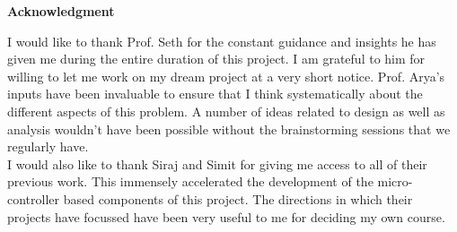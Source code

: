\newpage
\vspace*{0.75in}
\label{pg:ack}
\begin{center} {\bf \Huge Acknowledgment}\\[0.5in] \end{center}
{\normalsize I would like to thank Prof. Seth for the constant guidance and insights he has given me during
the entire duration of this project. I am grateful to him for willing to let me work on my dream project at a very short notice. Prof. Arya's inputs have been invaluable to ensure
that I think systematically about the different aspects of this problem. A number of ideas related to design as well as analysis wouldn't have been possible without the brainstorming sessions that we regularly have.\\

I would also like to thank Siraj and Simit for giving me access to all of their previous work. This immensely
accelerated the development of the micro-controller based components of this project. The directions in which
their projects have focussed have been very useful to me for deciding my own course.\\}

